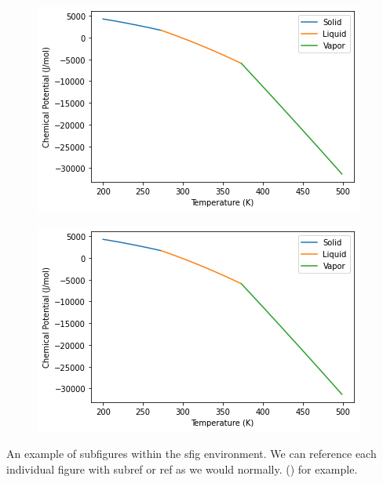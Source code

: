 \begin{sfig}
    \begin{subfigure}{0.45\textwidth}
        \centering
        \includegraphics[width=\textwidth,keepaspectratio]{figures/equilibriumplot.png}
        \caption{}
        \label{sfig:sub-example1}
    \end{subfigure}
    \begin{subfigure}{0.45\textwidth}
        \centering
        \includegraphics[width=\textwidth,keepaspectratio]{figures/equilibriumplot.png}
        \caption{}
        \label{sfig:sub-example2}
    \end{subfigure}
    \caption{
    An example of subfigures within the sfig environment.
    We can reference each individual figure with subref or ref as we would normally.
    () for example.
    }
    \label{sfig:example-sub-main}
\end{sfig}